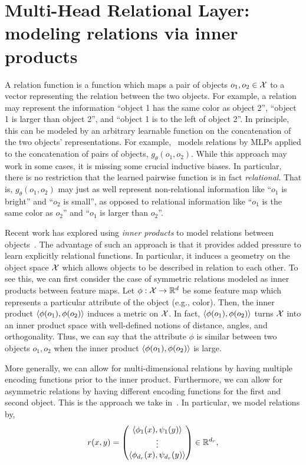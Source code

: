 \section{Multi-Head Relational Layer: modeling relations via inner products}\label{sec:mhr}

A relation function is a function which maps a pair of objects $o_1, o_2 \in {\mathcal{X}}$ to a vector representing the relation between the two objects. For example, a relation may represent the information ``object 1 has the same color as object 2'', ``object 1 is larger than object 2'', and ``object 1 is to the left of object 2''. In principle, this can be modeled by an arbitrary learnable function on the concatenation of the two objects' representations. For example,~\citep{santoroSimpleNeural2017} models relations by MLPs applied to the concatenation of pairs of objects, $g_\theta(o_1, o_2)$. While this approach may work in some cases, it is missing some crucial inductive biases. In particular, there is no restriction that the learned pairwise function is in fact \textit{relational}. That is, $g_\theta(o_1, o_2)$ may just as well represent non-relational information like ``$o_1$ is bright'' and ``$o_2$ is small'', as opposed to relational information like ``$o_1$ is the same color as $o_2$'' and ``$o_1$ is larger than $o_2$''.

Recent work has explored using \textit{inner products} to model relations between objects~\citep{webbEmergentSymbols2021, kergNeuralArchitecture2022, altabaaAbstractorsTransformer2023}. The advantage of such an approach is that it provides added pressure to learn explicitly relational functions. In particular, it induces a geometry on the object space ${\mathcal{X}}$ which allows objects to be described in relation to each other. To see this, we can first consider the case of symmetric relations modeled as inner products between feature maps. Let $\phi: {\mathcal{X}} \to \mathbb{R}^d$ be some feature map which represents a particular attribute of the object (e.g., color). Then, the inner product $\left \langle \phi(o_1), \phi(o_2) \right\rangle$ induces a metric on ${\mathcal{X}}$. In fact, $\left \langle \phi(o_1), \phi(o_2) \right\rangle$ turns ${\mathcal{X}}$ into an inner product space with well-defined notions of distance, angles, and orthogonality. Thus, we can say that the attribute $\phi$ is similar between two objects $o_1, o_2$ when the inner product $\left \langle \phi(o_1), \phi(o_2) \right\rangle$ is large.

More generally, we can allow for multi-dimensional relations by having multiple encoding functions prior to the inner product. Furthermore, we can allow for asymmetric relations by having different encoding functions for the first and second object. This is the approach we take in~\citep{altabaaAbstractorsTransformer2023}. In particular, we model relations by,
\begin{equation}\label{eq:relation_function}
    r(x, y) = \begin{pmatrix}
        \left \langle \phi_1(x), \psi_1(y) \right\rangle \\
        \vdots \\
        \left \langle \phi_{d_r}(x), \psi_{d_r}(y) \right\rangle
    \end{pmatrix} \in \mathbb{R}^{d_r},
\end{equation}

